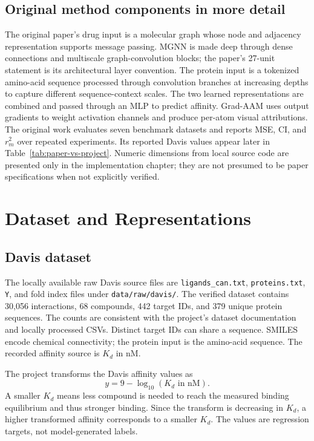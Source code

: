 \section{Original method components in more detail}
The original paper's drug input is a molecular graph whose node and adjacency representation supports message passing. MGNN is made deep through dense connections and multiscale graph-convolution blocks; the paper's 27-unit statement is its architectural layer convention. The protein input is a tokenized amino-acid sequence processed through convolution branches at increasing depths to capture different sequence-context scales. The two learned representations are combined and passed through an MLP to predict affinity. Grad-AAM uses output gradients to weight activation channels and produce per-atom visual attributions. The original work evaluates seven benchmark datasets and reports MSE, CI, and $r_m^2$ over repeated experiments. Its reported Davis values appear later in Table~\ref{tab:paper-vs-project}. Numeric dimensions from local source code are presented only in the implementation chapter; they are not presumed to be paper specifications when not explicitly verified.

\chapter{Dataset and Representations}
\section{Davis dataset}
The locally available raw Davis source files are \texttt{ligands\_can.txt}, \texttt{proteins.txt}, \texttt{Y}, and fold index files under \texttt{data/raw/davis/}. The verified dataset contains 30,056 interactions, 68 compounds, 442 target IDs, and 379 unique protein sequences. The counts are consistent with the project's dataset documentation and locally processed CSVs. Distinct target IDs can share a sequence. SMILES encode chemical connectivity; the protein input is the amino-acid sequence. The recorded affinity source is $K_d$ in nM.

The project transforms the Davis affinity values as
\begin{equation}\label{eq:pkd} y = 9-\log_{10}(K_d\text{ in nM}). \end{equation}
A smaller $K_d$ means less compound is needed to reach the measured binding equilibrium and thus stronger binding. Since the transform is decreasing in $K_d$, a higher transformed affinity corresponds to a smaller $K_d$. The values are regression targets, not model-generated labels.


